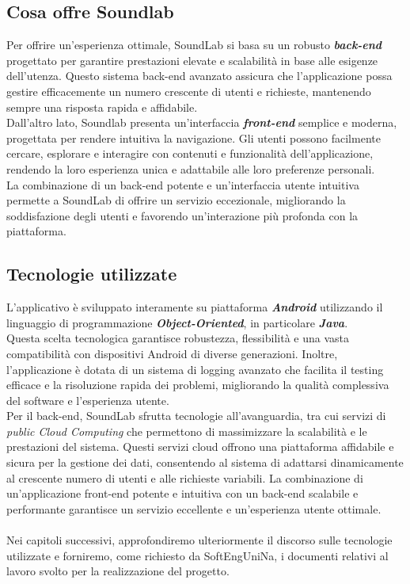 \documentclass{article}
\begin{document}
		\subsection{Cosa offre Soundlab}
		Per offrire un'esperienza ottimale, SoundLab si basa su un robusto \textbf{\textit{\textcolor{dark_purple}{back-end}}} progettato per garantire prestazioni elevate e scalabilità in base alle esigenze dell'utenza. Questo sistema back-end avanzato assicura che l'applicazione possa gestire efficacemente un numero crescente di utenti e richieste, mantenendo sempre una risposta rapida e affidabile.\\
		Dall'altro lato, Soundlab presenta un'interfaccia \textbf{\textit{\textcolor{dark_purple}{front-end}}} semplice e moderna, progettata per rendere intuitiva la navigazione. Gli utenti possono facilmente cercare, esplorare e interagire con contenuti e funzionalità dell'applicazione, rendendo la loro esperienza unica e adattabile alle loro preferenze personali.\\ 
		La combinazione di un back-end potente e un'interfaccia utente intuitiva permette a SoundLab di offrire un servizio eccezionale, migliorando la soddisfazione degli utenti e favorendo un'interazione più profonda con la piattaforma.
		\subsection{Tecnologie utilizzate}
		L'applicativo è sviluppato interamente su piattaforma \textbf{\textit{\textcolor{dark_purple}{Android}}} utilizzando il linguaggio di programmazione \textbf{\textit{\textcolor{dark_purple}{Object-Oriented}}}, in particolare \textbf{\textit{\textcolor{dark_purple}{Java}}}.\\
		Questa scelta tecnologica garantisce robustezza, flessibilità e una vasta compatibilità con dispositivi Android di diverse generazioni. Inoltre, l'applicazione è dotata di un sistema di logging avanzato che facilita il testing efficace e la risoluzione rapida dei problemi, migliorando la qualità complessiva del software e l'esperienza utente.\\
		Per il back-end, SoundLab sfrutta tecnologie all'avanguardia, tra cui servizi di \textit{public Cloud Computing} che permettono di massimizzare la scalabilità e le prestazioni del sistema. Questi servizi cloud offrono una piattaforma affidabile e sicura per la gestione dei dati, consentendo al sistema di adattarsi dinamicamente al crescente numero di utenti e alle richieste variabili. La combinazione di un'applicazione front-end potente e intuitiva con un back-end scalabile e performante garantisce un servizio eccellente e un'esperienza utente ottimale.
		\\
		\\
		Nei capitoli successivi, approfondiremo ulteriormente il discorso sulle tecnologie utilizzate e forniremo, come richiesto da SoftEngUniNa, i documenti relativi al lavoro svolto per la realizzazione del progetto.
\end{document}

